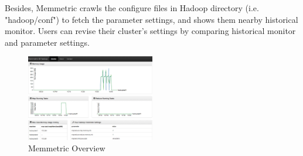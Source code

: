 Besides, Memmetric crawls the configure files in Hadoop directory (i.e. "hadoop/conf") to fetch the parameter settings, and shows them nearby historical monitor. Users can revise their cluster's settings by comparing historical monitor and parameter settings. 

\begin{figure}[h!]
  \centering
    \includegraphics[width=0.5\textwidth]{image/overview.png}
  \caption{Memmetric Overview}
\end{figure}

